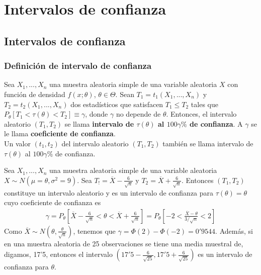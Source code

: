 \chapter{Intervalos de confianza}

\section{Intervalos de confianza}

\subsection{Definición de intervalo de confianza}

\begin{defi}
Sea $X_1,...,X_n$ una muestra aleatoria simple de una variable aleatoria $X$ con función de densidad $f(x;\theta)$, $\theta \in \Theta$. Sean $T_1 = t_1(X_1,...,X_n)$ y $T_2 = t_2(X_1,...,X_n)$ dos estadísticos que satisfacen $T_1 \leq T_2$ tales que $P_{\theta}[T_1 < \tau(\theta) < T_2] \equiv \gamma$, donde $\gamma$ no depende de $\theta$. Entonces, el intervalo aleatorio $(T_1,T_2)$ se llama \textbf{intervalo  de $\tau(\theta)$ al $100\gamma\% $ de confianza}. A $\gamma$ se le llama \textbf{coeficiente de confianza}.
\\
\newline
Un valor $(t_1,t_2)$ del intervalo aleatorio $(T_1,T_2)$ también se llama intervalo  de $\tau(\theta)$ al $100\gamma\% $ de confianza.
\end{defi}


\begin{ejemplo}
Sea $X_1,...,X_n$ una muestra aleatoria simple de una variable aleatoria $X \sim N(\mu = \theta,\sigma^2 =9)$. Sea $T_! = \overline{X} - \frac{6}{\sqrt{n}}$ y $T_2 = \overline{X} + \frac{6}{\sqrt{n}}$. Entonces $(T_1,T_2)$ constituye un intervalo aleatorio y es un intervalo de confianza para $\tau(\theta) = \theta$ cuyo coeficiente de confianza es
\begin{align*}
    \gamma = P_{\theta}\left[\overline{X} - \frac{6}{\sqrt{n}} < \theta < \overline{X} + \frac{6}{\sqrt{n}}\right] = P_{\theta}\left[ -2 < \frac{\overline{X} - \theta}{3/\sqrt{n}} < 2\right]
    \end{align*}
    Como $\overline{X} \sim N\left(\theta, \frac{\theta}{\sqrt{n}} \right)$, tenemos que $\gamma =\Phi(2) - \Phi(-2) = 0'9544$. Además, si en una muestra aleatoria de 25 observaciones se tiene una media muestral de, digamos, 17'5, entonces el intervalo $\left(17'5 - \frac{6}{\sqrt{25}}, 17'5 + \frac{6}{\sqrt{25}} \right)$ es un intervalo de confianza para $\theta$.
\end{ejemplo}

